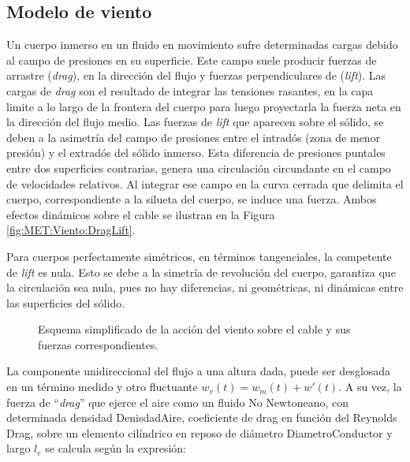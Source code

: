 \subsection{Modelo de viento}\label{Sec:PRE:Modeloviento}
Un cuerpo inmerso en un fluido en movimiento sufre determinadas cargas debido al campo de presiones en su superficie. Este campo suele producir fuerzas de arrastre (\textit{drag}), en la dirección del flujo y fuerzas perpendiculares de (\textit{lift}). Las cargas de \textit{drag} son el resultado de integrar las tensiones rasantes, en la capa limite a lo largo de la frontera del cuerpo para luego proyectarla la fuerza neta en la dirección del flujo medio. Las fuerzas de \textit{lift} que aparecen sobre el sólido, se deben a la asimetría del campo de presiones entre el intradós (zona de menor presión) y el extradós del sólido inmerso. Esta diferencia de presiones puntales entre dos superficies contrarias, genera una circulación circundante en el campo de velocidades relativos. Al integrar ese campo en la curva cerrada que delimita el cuerpo, correspondiente a la silueta del cuerpo, se induce una fuerza. Ambos efectos dinámicos sobre el cable se ilustran en la Figura \ref{fig:MET:Viento:DragLift}. 

Para cuerpos perfectamente simétricos, en términos tangenciales, la competente de \textit{lift} es nula.  Esto se debe a la simetría de revolución del cuerpo, garantiza que la circulación sea nula, pues no hay diferencias, ni geométricas, ni dinámicas entre las superficies del sólido. 

\begingroup
\begin{figure}[htbp]
	\centering
	\caption{Esquema simplificado de la acción del viento sobre el cable y sus fuerzas correspondientes.} 	\label{fig:Met:Viento:Esquemas}
\end{figure}
\endgroup

La componente unidireccional del flujo a una altura dada, puede ser desglosada en un término medido y otro fluctuante $w_v(t)=w_m(t)+{w}'(t)$. A su vez, la fuerza de ``\textit{drag}'' que ejerce el aire como un fluido No Newtoneano, con determinada densidad \gls{DenisdadAire}, coeficiente de drag en función del Reynolds \gls{Drag}, sobre un elemento cilíndrico en reposo de diámetro \gls{DiametroConductor} y largo $l_e$ se calcula según la expresión:

